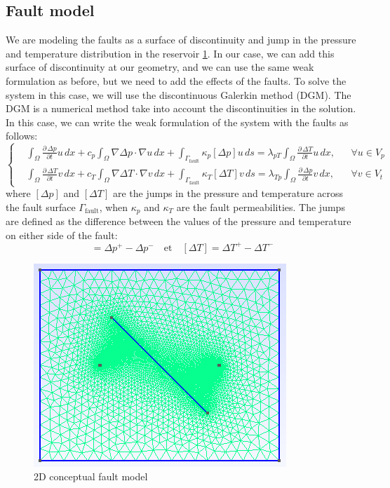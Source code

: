 \documentclass[a4paper,12pt]{report}
\begin{document}
\subsection{Fault model}
We are modeling the faults as a surface of discontinuity and jump in the pressure and temperature
distribution in the reservoir \ref{fig:fault}. In our case, we can add this surface of discontinuity
at our geometry, and we can use the same weak formulation as before, but we need to add
the effects of the faults. To solve the system in this case, we will use the discontinuous
Galerkin method (DGM). The DGM is a numerical method take into account
the discontinuities in the solution. In this case, we can write the weak formulation of the system with the faults as follows:
\begin{equation}
\left\{
\begin{aligned}
    &\int_{\Omega} \frac{\partial\, \Delta p}{\partial t} u \,dx + c_p \int_{\Omega} \nabla \Delta p \cdot \nabla u \,dx + \int_{\Gamma_{\text{fault}}} \kappa_p [\Delta p] u \,ds = \lambda_{pT} \int_{\Omega} \frac{\partial\, \Delta T}{\partial t} u \,dx,  && \forall u \in V_p \\[2mm]
    &\int_{\Omega} \frac{\partial\, \Delta T}{\partial t} v \,dx + c_T \int_{\Omega} \nabla \Delta T \cdot \nabla v \,dx + \int_{\Gamma_{\text{fault}}} \kappa_T [\Delta T] v \,ds = \lambda_{Tp} \int_{\Omega} \frac{\partial\, \Delta p}{\partial t} v \,dx, && \forall v \in V_t
\end{aligned}
\right.
\end{equation}
where $[\Delta p]$ and $[\Delta T]$ are the jumps in the pressure and temperature across the fault surface $\Gamma_{\text{fault}}$, when $\kappa_p$ and $\kappa_T$ are the fault permeabilities. 
The jumps are defined as the difference between the values of the pressure and temperature on either side of the fault:
\begin{equation}
[\Delta p] = \Delta p^+ - \Delta p^- \quad \text{et} \quad [\Delta T] = \Delta T^+ - \Delta T^-
\end{equation}
\begin{figure}[h!]
    \centering
        \centering
        \includegraphics[width=\textwidth]{Image/fail.png}
        \caption{2D conceptual fault model }
        \label{fig:fault}
\end{figure}
\end{document}
